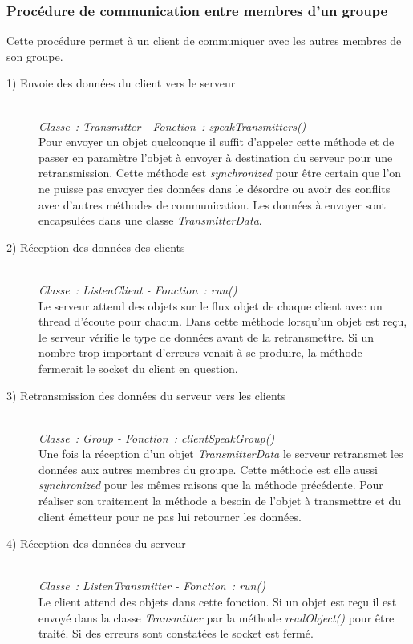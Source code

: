 \documentclass[a4paper, titlepage]{livret}
\begin{document}
\subsubsection{Procédure de communication entre membres d’un groupe}
Cette procédure permet à un client de communiquer avec les autres membres de son groupe.
\begin{description}
  \item[1) Envoie des données du client vers le serveur]
    \textit{\\Classe : Transmitter - Fonction : speakTransmitters()\\}
	  Pour envoyer un objet quelconque il suffit d’appeler cette méthode et de passer en paramètre l’objet à envoyer à destination du serveur pour une retransmission. Cette méthode est \textit{synchronized} pour être certain que l’on ne puisse pas envoyer des données dans le désordre ou avoir des conflits avec d’autres méthodes de communication. Les données à envoyer sont encapsulées dans une classe \textit{TransmitterData}.
	
	\item[2) Réception des données des clients]
	\textit{\\Classe : ListenClient - Fonction : run()\\}
	  Le serveur attend des objets sur le flux objet de chaque client avec un thread d'écoute pour chacun.
Dans cette méthode lorsqu’un objet est reçu, le serveur vérifie le type de données avant de la retransmettre. Si un nombre trop important d’erreurs venait à se produire, la méthode fermerait le socket du client en question.

  \item[3) Retransmission des données du serveur vers les clients]
  \textit{\\Classe : Group - Fonction : clientSpeakGroup()\\}
    Une fois la réception d’un objet  \textit{TransmitterData} le serveur retransmet les données aux autres membres du groupe. Cette méthode est elle aussi  \textit{synchronized} pour les mêmes raisons que la méthode précédente. Pour réaliser son traitement la méthode a besoin de l’objet à transmettre et du client émetteur pour ne pas lui retourner les données.
    
  \item[4) Réception des données du serveur]
  \textit{\\Classe : ListenTransmitter - Fonction : run()\\}
    Le client attend des objets dans cette fonction. Si un objet est reçu il est envoyé dans la classe \textit{Transmitter} par la méthode \textit{readObject()} pour être traité. Si des erreurs sont constatées le socket est fermé.
\end{description}
\end{document}

